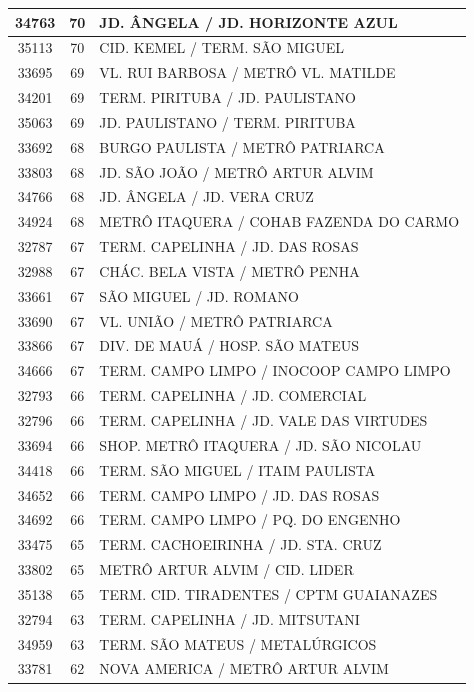 \documentclass[
	12pt,				%
	oneside,			%
	a4paper,			%
	english,			%
	brazil				%
	]{abntex2ppgsi}
\begin{document}
{{\begin{apendicesenv}
\begin{longtable}{c|c|p{7cm}}
 \hline 
34763 &	70 &	JD. ÂNGELA / JD. HORIZONTE AZUL \\ 
 \hline 
35113 &	70 &	CID. KEMEL / TERM. SÃO MIGUEL \\ 
 \hline 
33695 &	69 &	VL. RUI BARBOSA / METRÔ VL. MATILDE \\ 
 \hline 
34201 &	69 &	TERM. PIRITUBA / JD. PAULISTANO \\ 
 \hline 
35063 &	69 &	JD. PAULISTANO / TERM. PIRITUBA \\ 
 \hline 
33692 &	68 &	BURGO PAULISTA / METRÔ PATRIARCA \\ 
 \hline 
33803 &	68 &	JD. SÃO JOÃO / METRÔ ARTUR ALVIM \\ 
 \hline 
34766 &	68 &	JD. ÂNGELA / JD. VERA CRUZ \\ 
 \hline 
34924 &	68 &	METRÔ ITAQUERA / COHAB FAZENDA DO CARMO \\ 
 \hline 
32787 &	67 &	TERM. CAPELINHA / JD. DAS ROSAS \\ 
 \hline 
32988 &	67 &	CHÁC. BELA VISTA / METRÔ PENHA \\ 
 \hline 
33661 &	67 &	SÃO MIGUEL / JD. ROMANO \\ 
 \hline 
33690 &	67 &	VL. UNIÃO / METRÔ PATRIARCA \\ 
 \hline 
33866 &	67 &	DIV. DE MAUÁ / HOSP. SÃO MATEUS \\ 
 \hline 
34666 &	67 &	TERM. CAMPO LIMPO / INOCOOP CAMPO LIMPO \\ 
 \hline 
32793 &	66 &	TERM. CAPELINHA / JD. COMERCIAL \\ 
 \hline 
32796 &	66 &	TERM. CAPELINHA / JD. VALE DAS VIRTUDES \\ 
 \hline 
33694 &	66 &	SHOP. METRÔ ITAQUERA / JD. SÃO NICOLAU \\ 
 \hline 
34418 &	66 &	TERM. SÃO MIGUEL / ITAIM PAULISTA \\ 
 \hline 
34652 &	66 &	TERM. CAMPO LIMPO / JD. DAS ROSAS \\ 
 \hline 
34692 &	66 &	TERM. CAMPO LIMPO / PQ. DO ENGENHO \\ 
 \hline 
33475 &	65 &	TERM. CACHOEIRINHA / JD. STA. CRUZ \\ 
 \hline 
33802 &	65 &	METRÔ ARTUR ALVIM / CID. LIDER \\ 
 \hline 
35138 &	65 &	TERM. CID. TIRADENTES / CPTM GUAIANAZES \\ 
 \hline 
32794 &	63 &	TERM. CAPELINHA / JD. MITSUTANI \\ 
 \hline 
34959 &	63 &	TERM. SÃO MATEUS / METALÚRGICOS \\ 
 \hline 
33781 &	62 &	NOVA AMERICA / METRÔ ARTUR ALVIM \\ 

\end{longtable}
\end{apendicesenv}}}
\end{document}
